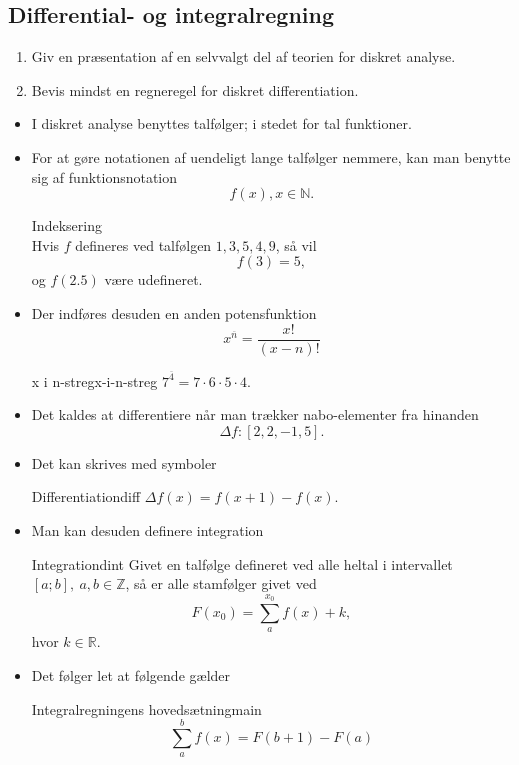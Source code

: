 \documentclass{article}
\begin{document}
\begin{tcolorbox}
	\section{Differential- og integralregning}
	\tcblower
	\begin{enumerate}
		\item Giv en præsentation af en selvvalgt del af teorien for diskret analyse.
		\item Bevis mindst en regneregel for diskret differentiation.
	\end{enumerate}
\end{tcolorbox}
\begin{itemize}
	\item I diskret analyse benyttes talfølger; i stedet for tal funktioner.
	\item For at gøre notationen af uendeligt lange talfølger nemmere, kan man benytte sig af funktionsnotation
		\[
			f(x), x\in\mathbb{N}.
		\]
		\begin{eksempel}{Indeksering}{}\\
			Hvis $f$ defineres ved talfølgen $1, 3, 5, 4, 9$, så vil
			\[
				f(3) = 5,
			\] 
			og $f(2.5)$ være udefineret.
		\end{eksempel}
	\item Der indføres desuden en anden potensfunktion
		\[
			x^{\overline{n}} = \frac{x!}{(x-n)!}
		\] 
		\begin{eksempel}{x i n-streg}{x-i-n-streg}
			$
				7^{\overline{4}} = 7 \cdot 6 \cdot 5 \cdot 4.
			$ 
		\end{eksempel}
	\item Det kaldes at differentiere når man trækker nabo-elementer fra hinanden
		\[
			\Delta f: [2, 2, -1, 5].
		\] 
	\item Det kan skrives med symboler
		\begin{definition}{Differentiation}{diff}
			$
				\Delta f(x) = f(x + 1) - f(x).
			$ 
		\end{definition}
	\item Man kan desuden definere integration
		\begin{definition}{Integration}{dint}
			Givet en talfølge defineret ved alle heltal i intervallet 
			$[a;b],\: a,b\in\mathbb{Z}$, så er alle stamfølger givet ved
			\[
				F(x_0) = \sum_a^{x_0} f(x) + k,
			\]
			hvor $k \in \mathbb{R}$.
		\end{definition}
	\item Det følger let at følgende gælder
		\begin{theorem}{Integralregningens hovedsætning}{main}
			\[
				\sum_a^b f(x) = F(b + 1) - F(a)
			\]
		\end{theorem}
\end{itemize}
\end{document}
